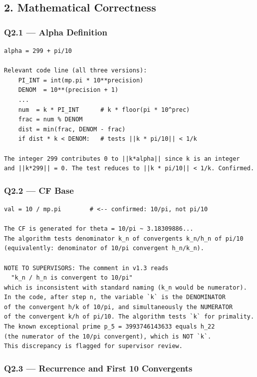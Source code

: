 \documentclass[11pt,a4paper]{article}
\begin{document}
\subsection{2. Mathematical Correctness}

\subsubsection*{Q2.1 --- Alpha Definition}

\begin{lstlisting}
alpha = 299 + pi/10

Relevant code line (all three versions):
    PI_INT = int(mp.pi * 10**precision)
    DENOM  = 10**(precision + 1)
    ...
    num  = k * PI_INT      # k * floor(pi * 10^prec)
    frac = num % DENOM
    dist = min(frac, DENOM - frac)
    if dist * k < DENOM:   # tests ||k * pi/10|| < 1/k

The integer 299 contributes 0 to ||k*alpha|| since k is an integer
and ||k*299|| = 0. The test reduces to ||k * pi/10|| < 1/k. Confirmed.
\end{lstlisting}

\subsubsection*{Q2.2 --- CF Base}

\begin{lstlisting}
val = 10 / mp.pi        # <-- confirmed: 10/pi, not pi/10

The CF is generated for theta = 10/pi ~ 3.18309886...
The algorithm tests denominator k_n of convergents k_n/h_n of pi/10
(equivalently: denominator of 10/pi convergent h_n/k_n).

NOTE TO SUPERVISORS: The comment in v1.3 reads
  "k_n / h_n is convergent to 10/pi"
which is inconsistent with standard naming (k_n would be numerator).
In the code, after step n, the variable `k` is the DENOMINATOR
of the convergent h/k of 10/pi, and simultaneously the NUMERATOR
of the convergent k/h of pi/10. The algorithm tests `k` for primality.
The known exceptional prime p_5 = 3993746143633 equals h_22
(the numerator of the 10/pi convergent), which is NOT `k`.
This discrepancy is flagged for supervisor review.
\end{lstlisting}

\subsubsection*{Q2.3 --- Recurrence and First 10 Convergents}
\end{document}
